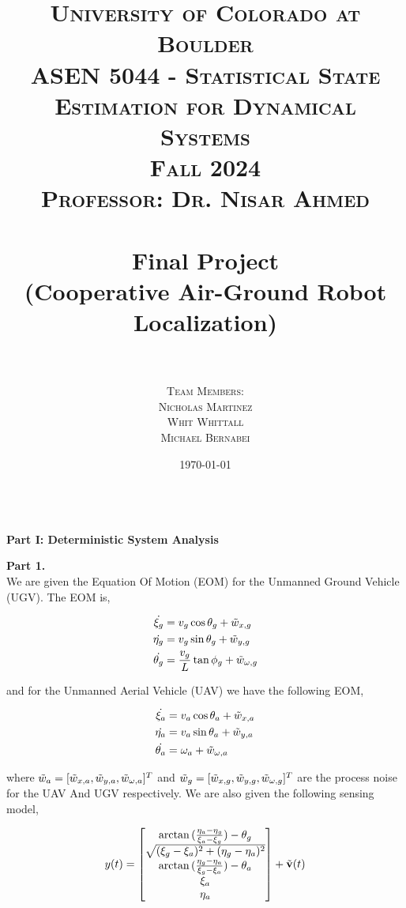 \documentclass[paper=a4, fontsize=11pt]{scrartcl} %
\title{
\normalfont \LARGE
\textsc{University of Colorado at Boulder} \\ [25pt] %
\textsc{ASEN 5044 - Statistical State Estimation for Dynamical Systems} \\ [20pt]
\textsc{Fall 2024} \\ [20pt]
\textsc{Professor: Dr. Nisar Ahmed} \\ [12pt]
\horrule{1pt} \\[0.4cm] %
\huge Final Project \\ %
\huge (Cooperative Air-Ground Robot Localization) \\ 
\horrule{1pt} \\[0.6cm] %
}
\author{
  \textsc{ Team Members:} \\ [4 mm]
  \textsc{ Nicholas Martinez}\\[2mm]
  \textsc{ Whit Whittall } \\[2mm]
  \textsc{ Michael Bernabei}\\[2mm]
}
\date{\normalsize\today} %
\numberwithin{equation}{section} %
\numberwithin{figure}{section} %
\numberwithin{table}{section} %
\begin{document}
\maketitle %
\thispagestyle{empty} %
\newpage


%

\textbf{\\ Part I: Deterministic System Analysis }
\begin{framed}
\textbf{Part 1.} \\

We are given the Equation Of Motion (EOM) for the Unmanned Ground Vehicle (UGV).  The EOM is,

\begin{align*}
    \dot{\xi_g} &= v_g \cos{\theta_g} + \Tilde{w}_{x,g} \\
    \dot{\eta_g} &= v_g \sin{\theta_g} + \Tilde{w}_{y,g} \\
    \dot{\theta_g} &= \frac{v_g}{L}\tan{\phi_g}  + \Tilde{w}_{\omega,g} \\
\end{align*}

and for the Unmanned Aerial Vehicle (UAV) we have the following EOM,

\begin{align*}
    \dot{\xi_a} &= v_a \cos{\theta_a} + \Tilde{w}_{x,a} \\
    \dot{\eta_a} &= v_a \sin{\theta_a} + \Tilde{w}_{y,a} \\
    \dot{\theta_a} &= \omega_a  + \Tilde{w}_{\omega,a} \\
\end{align*}

where $\Tilde{w}_a = [ \Tilde{w}_{x,a},  \Tilde{w}_{y,a},  \Tilde{w}_{\omega,a}]^T$ and $\Tilde{w}_g = [ \Tilde{w}_{x,g},  \Tilde{w}_{y,g},  \Tilde{w}_{\omega,g}]^T$ are the process noise for the UAV And UGV respectively.  We are also given the following sensing model,

\begin{align*}
y(t) &=  
\begin{bmatrix} \arctan{(\frac{\eta_a - \eta_g}{\xi_a - \xi_g}}) - \theta_g   \\ 
                \sqrt{  (\xi_g - \xi_a)^2 + (\eta_g - \eta_a)^2}  \\
                \arctan{(\frac{\eta_g - \eta_a}{\xi_g - \xi_a})} - \theta_a \\
                \xi_a \\
                \eta_a
\end{bmatrix}  + \Tilde{\bold{v}}(t) \\
\end{align*}


\end{framed}
\end{document}
